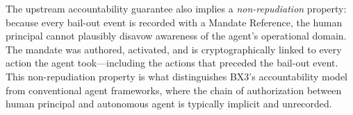 The upstream accountability guarantee also implies a \textit{non-repudiation} property: because every bail-out event is recorded with a Mandate Reference, the human principal cannot plausibly disavow awareness of the agent's operational domain. The mandate was authored, activated, and is cryptographically linked to every action the agent took—including the actions that preceded the bail-out event. This non-repudiation property is what distinguishes BX3's accountability model from conventional agent frameworks, where the chain of authorization between human principal and autonomous agent is typically implicit and unrecorded.


